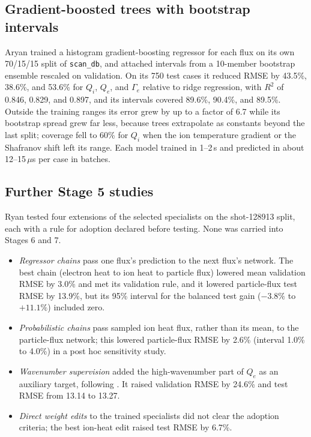 \documentclass[12pt,letterpaper]{article}
\begin{document}
\subsection{Gradient-boosted trees with bootstrap intervals}
\label{app:gbdt}

Aryan trained a histogram gradient-boosting regressor \citep{friedman2001,ke2017lightgbm}
for each flux on its own 70/15/15 split of \texttt{scan\_db}, and attached intervals from a
10-member bootstrap ensemble rescaled on validation. On its 750 test cases it reduced RMSE
by 43.5\%, 38.6\%, and 53.6\% for $Q_i$, $Q_e$, and $\Gamma_e$ relative to ridge regression,
with $R^2$ of 0.846, 0.829, and 0.897, and its intervals covered 89.6\%, 90.4\%, and 89.5\%.
Outside the training ranges its error grew by up to a factor of 6.7 while its bootstrap
spread grew far less, because trees extrapolate as constants beyond the last split; coverage
fell to 60\% for $Q_i$ when the ion temperature gradient or the Shafranov shift left its
range. Each model trained
in 1--2\,s and predicted in about 12--15\,$\mu$s per case in batches.

\subsection{Further Stage 5 studies}
\label{app:stage5}

Ryan tested four extensions of the selected specialists on the shot-128913 split, each with
a rule for adoption declared before testing. None was carried into Stages 6 and 7.
\begin{itemize}
  \item \emph{Regressor chains} pass one flux's prediction to the next flux's network. The
        best chain (electron heat to ion heat to particle flux) lowered mean validation RMSE
        by 3.0\% and met its validation rule, and it lowered particle-flux test RMSE by 13.9\%,
        but its 95\% interval for the balanced test gain ($-3.8\%$ to $+11.1\%$) included zero.
  \item \emph{Probabilistic chains} pass sampled ion heat flux, rather than its mean, to the
        particle-flux network; this lowered particle-flux RMSE by 2.6\% (interval 1.0\% to
        4.0\%) in a post hoc sensitivity study.
  \item \emph{Wavenumber supervision} added the high-wavenumber part of $Q_e$ as an
        auxiliary target, following \citet{cao2026}. It raised validation RMSE by 24.6\%
        and test RMSE from 13.14 to 13.27.
  \item \emph{Direct weight edits} to the trained specialists did not clear the adoption
        criteria; the best ion-heat edit raised test RMSE by 6.7\%.
\end{itemize}
\end{document}
